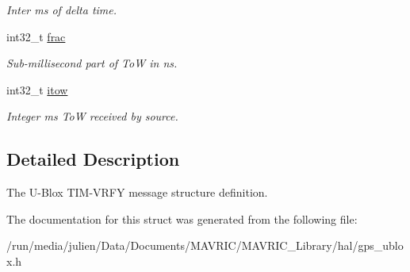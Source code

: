 \begin{DoxyCompactItemize}
\begin{DoxyCompactList}\small\item\em Inter ms of delta time. \end{DoxyCompactList}\item 
\hypertarget{structubx__tim__vrfy__t_ae26ea642925119086dde57b19affd2a0}{int32\+\_\+t \hyperlink{structubx__tim__vrfy__t_ae26ea642925119086dde57b19affd2a0}{frac}}\label{structubx__tim__vrfy__t_ae26ea642925119086dde57b19affd2a0}

\begin{DoxyCompactList}\small\item\em Sub-\/millisecond part of To\+W in ns. \end{DoxyCompactList}\item 
\hypertarget{structubx__tim__vrfy__t_adac78be51ab9b9d94e692f6049e83f67}{int32\+\_\+t \hyperlink{structubx__tim__vrfy__t_adac78be51ab9b9d94e692f6049e83f67}{itow}}\label{structubx__tim__vrfy__t_adac78be51ab9b9d94e692f6049e83f67}

\begin{DoxyCompactList}\small\item\em Integer ms To\+W received by source. \end{DoxyCompactList}\end{DoxyCompactItemize}


\subsection{Detailed Description}
The U-\/\+Blox T\+I\+M-\/\+V\+R\+F\+Y message structure definition. 

The documentation for this struct was generated from the following file\+:\begin{DoxyCompactItemize}
\item 
/run/media/julien/\+Data/\+Documents/\+M\+A\+V\+R\+I\+C/\+M\+A\+V\+R\+I\+C\+\_\+\+Library/hal/gps\+\_\+ublox.\+h\end{DoxyCompactItemize}

